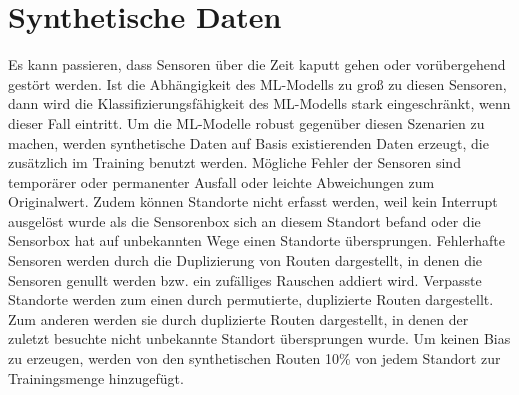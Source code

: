 \section{Synthetische Daten}
Es kann passieren, dass Sensoren über die Zeit kaputt gehen oder vorübergehend gestört werden.
Ist die Abhängigkeit des ML-Modells zu groß zu diesen Sensoren, dann wird die Klassifizierungsfähigkeit des ML-Modells stark eingeschränkt, wenn dieser Fall eintritt.
Um die ML-Modelle robust gegenüber diesen Szenarien zu machen, werden synthetische Daten auf Basis existierenden Daten erzeugt, die zusätzlich im Training benutzt werden.
\newpage
Mögliche Fehler der Sensoren sind temporärer oder permanenter Ausfall oder leichte Abweichungen zum Originalwert.
Zudem können Standorte nicht erfasst werden, weil kein Interrupt ausgelöst wurde als die Sensorenbox sich an diesem Standort befand
oder die Sensorbox hat auf unbekannten Wege einen Standorte übersprungen.
\newline
\newline
Fehlerhafte Sensoren werden durch die Duplizierung von Routen dargestellt, in denen die Sensoren genullt werden bzw. ein zufälliges Rauschen addiert wird.
Verpasste Standorte werden zum einen durch permutierte, duplizierte Routen dargestellt.
Zum anderen werden sie durch duplizierte Routen dargestellt, in denen der zuletzt besuchte nicht unbekannte Standort übersprungen wurde.
Um keinen Bias zu erzeugen, werden von den synthetischen Routen 10\% von jedem Standort zur Trainingsmenge hinzugefügt.